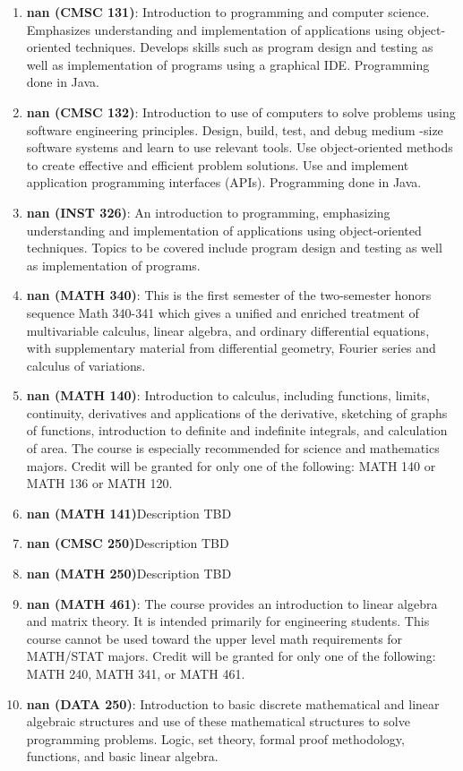 \begin{enumerate}
\item \textbf{nan (CMSC 131)}: Introduction to programming and computer science. Emphasizes understanding and implementation of applications using object-oriented techniques. Develops skills such as program design and testing as well as implementation of programs using a graphical IDE. Programming done in Java.
\item \textbf{nan (CMSC 132)}: Introduction to use of computers to solve problems using software engineering principles. Design, build, test, and debug medium -size software systems and learn to use relevant tools. Use object-oriented methods to create effective and efficient problem solutions. Use and implement application programming interfaces (APIs). Programming done in Java.
\item \textbf{nan (INST 326)}: An introduction to programming, emphasizing understanding and
implementation of applications using object-oriented techniques. Topics to
be covered include program design and testing as well as implementation of
programs.
\item \textbf{nan (MATH 340)}: This is the first semester of the two-semester honors sequence Math 340-341 which gives a unified and enriched treatment of multivariable calculus, linear algebra, and ordinary differential equations, with supplementary material from differential geometry, Fourier series and calculus of variations.
\item \textbf{nan (MATH 140)}: Introduction to calculus, including functions, limits, continuity, derivatives and applications of the derivative, sketching of graphs of functions, introduction to definite and indefinite integrals, and calculation of area. The course is especially recommended for science and mathematics majors. Credit will be granted for only one of the following: MATH 140 or MATH 136 or MATH 120.
\item \textbf{nan (MATH 141)}Description TBD
\item \textbf{nan (CMSC 250)}Description TBD
\item \textbf{nan (MATH 250)}Description TBD
\item \textbf{nan (MATH 461)}: The course provides an introduction to linear algebra and matrix theory. It is intended primarily for engineering students. This course cannot be used toward the upper level math requirements for MATH/STAT majors. Credit will be granted for only one of the following: MATH 240, MATH 341, or MATH 461.
\item \textbf{nan (DATA 250)}:  Introduction to basic discrete mathematical and linear algebraic structures and use of these mathematical structures to solve programming problems. Logic, set theory, formal proof methodology, functions, and basic linear algebra.

\end{enumerate}
